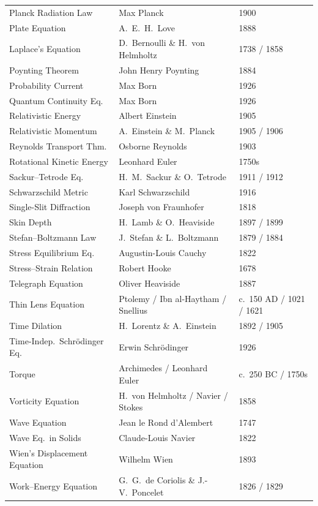 \begin{longtable}{p{5.5cm}p{4.5cm}p{2cm}}
Planck Radiation Law & Max Planck & 1900 \\
Plate Equation & A.\ E.\ H.\ Love & 1888 \\
Laplace's Equation & D.\ Bernoulli \& H.\ von Helmholtz & 1738 / 1858 \\
Poynting Theorem & John Henry Poynting & 1884 \\
Probability Current & Max Born & 1926 \\
Quantum Continuity Eq. & Max Born & 1926 \\
Relativistic Energy & Albert Einstein & 1905 \\
Relativistic Momentum & A.\ Einstein \& M.\ Planck & 1905 / 1906 \\
Reynolds Transport Thm. & Osborne Reynolds & 1903 \\
Rotational Kinetic Energy & Leonhard Euler & 1750s \\
Sackur--Tetrode Eq. & H.\ M.\ Sackur \& O.\ Tetrode & 1911 / 1912 \\
Schwarzschild Metric & Karl Schwarzschild & 1916 \\
Single-Slit Diffraction & Joseph von Fraunhofer & 1818 \\
Skin Depth & H.\ Lamb \& O.\ Heaviside & 1897 / 1899 \\
Stefan--Boltzmann Law & J.\ Stefan \& L.\ Boltzmann & 1879 / 1884 \\
Stress Equilibrium Eq. & Augustin-Louis Cauchy & 1822 \\
Stress--Strain Relation & Robert Hooke & 1678 \\
Telegraph Equation & Oliver Heaviside & 1887 \\
Thin Lens Equation & Ptolemy / Ibn al-Haytham / Snellius & c.\ 150 AD / 1021 / 1621 \\
Time Dilation & H.\ Lorentz \& A.\ Einstein & 1892 / 1905 \\
Time-Indep.\ Schr\"odinger Eq. & Erwin Schr\"odinger & 1926 \\
Torque & Archimedes / Leonhard Euler & c.\ 250 BC / 1750s \\
Vorticity Equation & H.\ von Helmholtz / Navier / Stokes & 1858 \\
Wave Equation & Jean le Rond d'Alembert & 1747 \\
Wave Eq.\ in Solids & Claude-Louis Navier & 1822 \\
Wien's Displacement Equation & Wilhelm Wien & 1893 \\
Work--Energy Equation & G.\ G.\ de Coriolis \& J.-V.\ Poncelet & 1826 / 1829 \\
\end{longtable}

